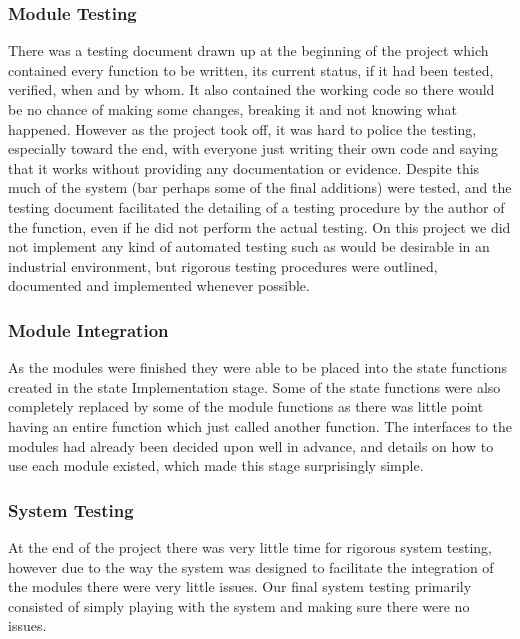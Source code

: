 \documentclass[]{report}
\begin{document}
\subsubsection{Module Testing}
There was a testing document drawn up at the beginning of the project which contained every function to be written, its current status, if it had been tested, verified, when and by whom. It also contained the working code so there would be no chance of making some changes, breaking it and not knowing what happened. However as the project took off, it was hard to police the testing, especially toward the end, with everyone just writing their own code and saying that it works without providing any documentation or evidence. Despite this much of the system (bar perhaps some of the final additions) were tested, and the testing document facilitated the detailing of a testing procedure by the author of the function, even if he did not perform the actual testing. \newline
On this project we did not implement any kind of automated testing such as would be desirable in an industrial environment, but rigorous testing procedures were outlined, documented and implemented whenever possible.

\subsubsection{Module Integration}
As the modules were finished they were able to be placed into the state functions created in the state Implementation stage. Some of the state functions were also completely replaced by some of the module functions as there was little point having an entire function which just called another function. The interfaces to the modules had already been decided upon well in advance, and details on how to use each module existed, which made this stage surprisingly simple.

\subsubsection{System Testing}
At the end of the project there was very little time for rigorous system testing, however due to the way the system was designed to facilitate the integration of the modules there were very little issues. Our final system testing primarily consisted of simply playing with the system and making sure there were no issues.
\end{document}
